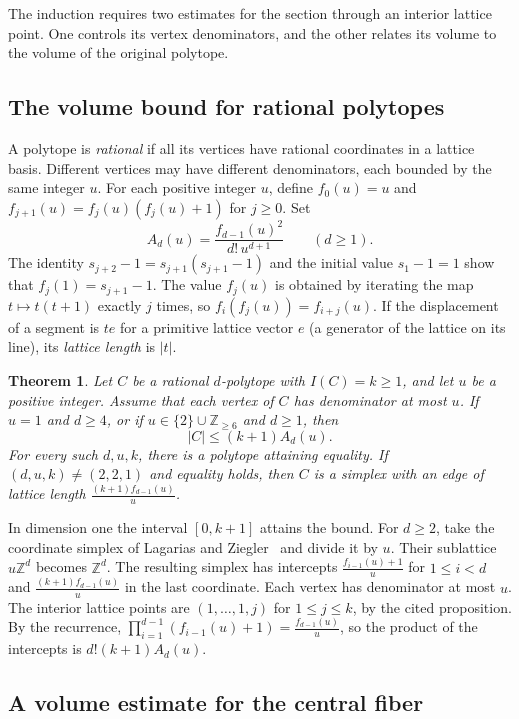 \documentclass[reqno, 11pt]{article}
\numberwithin{equation}{section}
\newtheorem{theorem}{Theorem}[section]
\theoremstyle{definition}
\newcommand{\Z}{\mathbb Z}
\begin{document}
The induction requires two estimates for the section through an
interior lattice point. One controls its vertex denominators, and
the other relates its volume to the volume of the original polytope.

\subsection{The volume bound for rational polytopes}

A polytope is \emph{rational} if all its vertices have rational
coordinates in a lattice basis. Different vertices may have different
denominators, each bounded by the same integer $u$.
For each positive integer $u$, define $f_0(u)=u$ and
$f_{j+1}(u)=f_j(u)(f_j(u)+1)$ for $j\ge0$. Set
\[
 A_d(u)=\frac{f_{d-1}(u)^2}{d!\,u^{d+1}}\qquad(d\ge1).
\]
The identity $s_{j+2}-1=s_{j+1}(s_{j+1}-1)$ and the initial value
$s_1-1=1$ show that $f_j(1)=s_{j+1}-1$. The value $f_j(u)$ is
obtained by iterating the map $t\mapsto t(t+1)$ exactly $j$ times,
so $f_i(f_j(u))=f_{i+j}(u)$. If the displacement of a segment is
$te$ for a primitive lattice vector
$e$ (a generator of the lattice on its
line), its \emph{lattice length} is $|t|$.

\begin{theorem}\label{thm:general-rational}
Let $C$ be a rational $d$-polytope with $I(C)=k\ge1$, and let $u$ be
a positive integer. Assume that each vertex of $C$ has denominator at
most $u$. If $u=1$ and $d\ge4$, or if $u\in\{2\}\cup\Z_{\ge6}$ and
$d\ge1$, then
\[
                         |C|\le(k+1)A_d(u).
\]
For every such $d,u,k$, there is a polytope attaining equality.
If $(d,u,k)\ne(2,2,1)$ and equality holds, then $C$ is a simplex
with an edge of lattice length $\frac{(k+1)f_{d-1}(u)}{u}$.
\end{theorem}

In dimension one the interval $[0,k+1]$ attains the bound.
For $d\ge2$, take the coordinate simplex of Lagarias and
Ziegler~\cite[Proposition~2.6]{LZ} and divide it by $u$. Their
sublattice $u\Z^d$ becomes $\Z^d$. The resulting simplex has
intercepts $\frac{f_{i-1}(u)+1}{u}$ for $1\le i<d$ and
$\frac{(k+1)f_{d-1}(u)}{u}$ in the last coordinate. Each vertex has
denominator at most $u$. The interior lattice
points are $(1,\ldots,1,j)$ for $1\le j\le k$, by the cited
proposition. By the recurrence,
$\prod_{i=1}^{d-1}(f_{i-1}(u)+1)=\frac{f_{d-1}(u)}{u}$, so the product
of the intercepts is $d!(k+1)A_d(u)$.

\subsection{A volume estimate for the central fiber}
\end{document}

